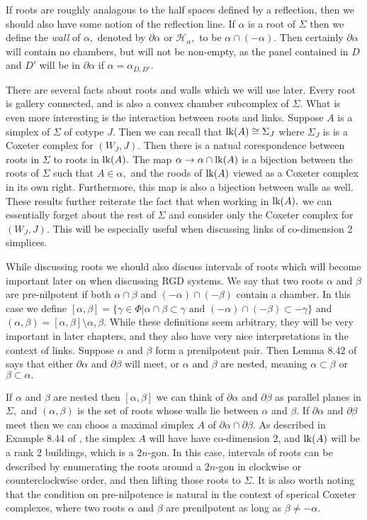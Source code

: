 \documentclass[class=book, crop=false,12 pt]{standalone}
\begin{document}
If roots are roughly analagous to the half spaces defined by a reflection, then we should also have some notion of the reflection line. If $\alpha$ is a root of $\Sigma$ then we define the \emph{wall} of $\alpha,$ denoted by $\partial\alpha$ or $\mathcal{H}_\alpha,$ to be $\alpha\cap (-\alpha).$ Then certainly $\partial \alpha$ will contain no chambers, but will not be non-empty, as the panel contained in $D$ and $D'$ will be in $\partial\alpha$ if $\alpha=\alpha_{D,D'}.$

There are several facts about roots and walls which we will use later. Every root is gallery connected, and is also a convex chamber subcomplex of $\Sigma.$ What is even more interesting is the interaction between roots and links. Suppose $A$ is a simplex of $\Sigma$ of cotype $J.$ Then we can recall that $\mathrm{lk}(A)\cong \Sigma_J$ where $\Sigma_J$ is is a Coxeter complex for $(W_J,J).$ Then there is a natual corespondence between roots in $\Sigma$ to roots in $\mathrm{lk}(A).$ The map $\alpha \to \alpha \cap \mathrm{lk}(A)$ is a bijection between the roots of $\Sigma$ such that $A\in \alpha,$ and the roods of $\mathrm{lk}(A)$ viewed as a Coxeter complex in its own right. Furthermore, this map is also a bijection between walls as well. These results further reiterate the fact that when working in $\mathrm{lk}(A),$ we can essentially forget about the rest of $\Sigma$ and consider only the Coxeter complex for $(W_J,J).$ This will be especially useful when discussing links of co-dimension 2 simplices.

While discussing roots we should also discuss intervals of roots which will become important later on when discussing RGD systems. We say that two roots $\alpha$ and $\beta$ are pre-nilpotent if both $\alpha\cap \beta$ and $(-\alpha)\cap (-\beta)$ contain a chamber. In this case we define $[\alpha,\beta]=\{\gamma\in \Phi|\alpha\cap \beta \subset \gamma \text{ and } (-\alpha)\cap (-\beta)\subset -\gamma\}$ and $(\alpha,\beta)=[\alpha,\beta]\setminus {\alpha,\beta}.$ While these definitions seem arbitrary, they will be very important in later chapters, and they also have very nice interpretations in the context of links. Suppose $\alpha$ and $\beta$ form a prenilpotent pair. Then Lemma 8.42 of \cite{buildings} says that either $\partial \alpha$ and $\partial \beta$ will meet, or $\alpha$ and $\beta$ are nested, meaning $\alpha\subset \beta$ or $\beta\subset \alpha.$

If $\alpha$ and $\beta$ are nested then $[\alpha,\beta]$ we can think of $\partial \alpha$ and $\partial\beta$ as parallel planes in $\Sigma,$ and $(\alpha,\beta)$ is the set of roots whose walls lie between $\alpha$ and $\beta.$ If $\partial \alpha$ and $\partial\beta$ meet then we can choos a maximal simplex $A$ of $\partial\alpha\cap\partial\beta.$ As described in Example 8.44 of \cite{buildings}, the simplex $A$ will have have co-dimension 2, and $\mathrm{lk}(A)$ will be a rank 2 buildings, which is a $2n$-gon. In this case, intervals of roots can be described by enumerating the roots around a $2n$-gon in clockwise or counterclockwise order, and then lifting those roots to $\Sigma.$ It is also worth noting that the condition on pre-nilpotence is natural in the context of sperical Coxeter complexes, where two roots $\alpha$ and $\beta$ are prenilpotent as long as $\beta \neq -\alpha.$
\end{document}
